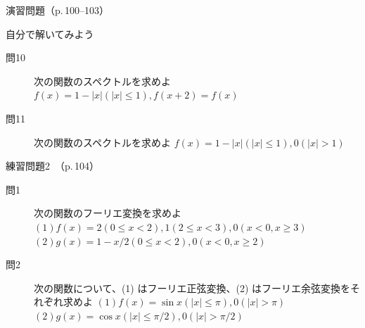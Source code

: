 \documentclass[aspectratio=43,professionalfonts,handout]{beamer}
\begin{document}
\begin{frame}{演習問題（p.\,100--103）}
  \begin{exampleblock}{自分で解いてみよう}
  \begin{description}
    \item[問10] 次の関数のスペクトルを求めよ
    $f(x) = 1 - |x|  (|x| \leq 1),  f(x+2) = f(x)$\\
    \item[問11] 次の関数のスペクトルを求めよ
    $f(x) = { 1-|x|  (|x| \leq 1),  0  (|x| > 1) }$\\
  \end{description}
  \end{exampleblock}
\end{frame}

\begin{frame}{練習問題2　（p.\,104）}
  \begin{block}{}
  \begin{description}
    \item[問1] 次の関数のフーリエ変換を求めよ
    $(1) f(x) = { 2  (0 \leq x < 2),  1  (2 \leq x < 3),  0  (x < 0, x \geq 3) }$\\
    $(2) g(x) = { 1 - x/2  (0 \leq x < 2),  0  (x < 0, x \geq 2) }$\\
    \item[問2] 次の関数について、(1) はフーリエ正弦変換、(2) はフーリエ余弦変換をそれぞれ求めよ
    $(1) f(x) = { \sin x  (|x| \leq \pi),  0  (|x| > \pi) }$\\
    $(2) g(x) = { \cos x  (|x| \leq \pi/2),  0  (|x| > \pi/2) }$\\
  \end{description}
  \end{block}
\end{frame}
\end{document}
